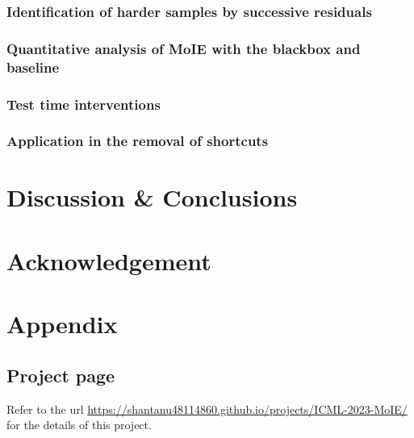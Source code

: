 \documentclass{article}
\theoremstyle{plain}
\theoremstyle{definition}
\theoremstyle{remark}
\begin{document}
\subsubsection{Identification of harder samples by successive residuals}
\label{Sec:residual}



\subsubsection{Quantitative analysis of MoIE with the blackbox and baseline}


\subsubsection{Test time interventions}


\subsubsection{Application in the removal of shortcuts}




\section{Discussion \& Conclusions}


\section{Acknowledgement}







\newpage
\appendix
\onecolumn
\section{Appendix}
\subsection{Project page }
Refer to the url \url{https://shantanu48114860.github.io/projects/ICML-2023-MoIE/} for the details of this project.
\label{app:code}
\end{document}
